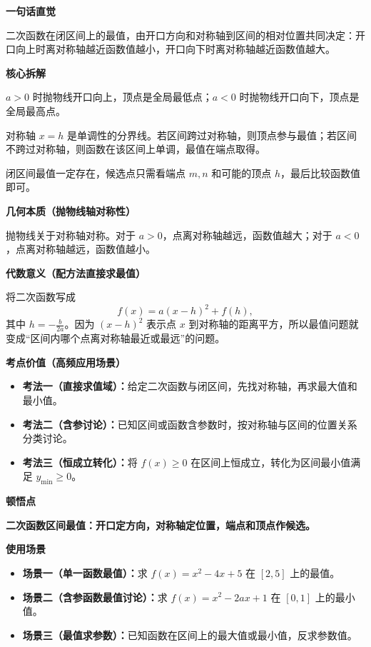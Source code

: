 \begin{explanationbox}
	\textbf{\textcolor{CExplanation}{一句话直觉}}

	二次函数在闭区间上的最值，由开口方向和对称轴到区间的相对位置共同决定：开口向上时离对称轴越近函数值越小，开口向下时离对称轴越近函数值越大。

	\medskip
	\textbf{\textcolor{CExplanation}{核心拆解}}
	\begin{description}[style=nextline, leftmargin=2.8em, labelsep=0.5em, itemsep=0.45em]
		\item[\textbf{要点一（开口决定整体形状）：}]
		      $a>0$ 时抛物线开口向上，顶点是全局最低点；$a<0$ 时抛物线开口向下，顶点是全局最高点。
		\item[\textbf{要点二（对称轴决定单调分界）：}]
		      对称轴 $x=h$ 是单调性的分界线。若区间跨过对称轴，则顶点参与最值；若区间不跨过对称轴，则函数在该区间上单调，最值在端点取得。
		\item[\textbf{要点三（端点比较兜底）：}]
		      闭区间最值一定存在，候选点只需看端点 $m,n$ 和可能的顶点 $h$，最后比较函数值即可。
	\end{description}

	\medskip
	\textbf{\textcolor{CExplanation}{几何本质（抛物线轴对称性）}}

	抛物线关于对称轴对称。对于 $a>0$，点离对称轴越远，函数值越大；对于 $a<0$，点离对称轴越远，函数值越小。

	\medskip
	\textbf{\textcolor{CExplanation}{代数意义（配方法直接求最值）}}

	将二次函数写成
	\[
		f(x)=a(x-h)^2+f(h),
	\]
	其中 $h=-\frac{b}{2a}$。因为 $(x-h)^2$ 表示点 $x$ 到对称轴的距离平方，所以最值问题就变成“区间内哪个点离对称轴最近或最远”的问题。

	\medskip
	\textbf{\textcolor{CExplanation}{考点价值（高频应用场景）}}
	\begin{itemize}[leftmargin=*, itemsep=0.5em, topsep=0.4em]
		\item \textbf{考法一（直接求值域）：}给定二次函数与闭区间，先找对称轴，再求最大值和最小值。
		\item \textbf{考法二（含参讨论）：}已知区间或函数含参数时，按对称轴与区间的位置关系分类讨论。
		\item \textbf{考法三（恒成立转化）：}将 $f(x)\ge0$ 在区间上恒成立，转化为区间最小值满足 $y_{\min}\ge0$。
	\end{itemize}

	\medskip
	\textbf{\textcolor{CExplanation}{顿悟点}}

	\textbf{二次函数区间最值：开口定方向，对称轴定位置，端点和顶点作候选。}

	\medskip
	\textbf{\textcolor{CExplanation}{使用场景}}
	\begin{itemize}[leftmargin=*, itemsep=0.5em, topsep=0.4em]
		\item \textbf{场景一（单一函数最值）：}求 $f(x)=x^2-4x+5$ 在 $[2,5]$ 上的最值。
		\item \textbf{场景二（含参函数最值讨论）：}求 $f(x)=x^2-2ax+1$ 在 $[0,1]$ 上的最小值。
		\item \textbf{场景三（最值求参数）：}已知函数在区间上的最大值或最小值，反求参数值。
	\end{itemize}
\end{explanationbox}